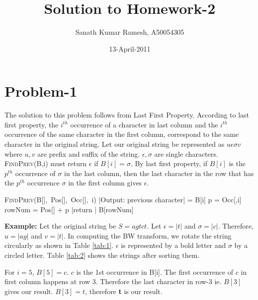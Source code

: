 \documentclass{article}
\begin{document}
\title{Solution to Homework-2}
\author{Sanath Kumar Ramesh, A50054305}
\date{13-April-2011}
\maketitle

\section{Problem-1}
The solution to this problem follows from Last First Property. According to last first property, the $i^{th}$ occurrence of a character in last column and the $i^{th}$ occurrence of the same character in the first column, correspond to the same character in the original string. Let our original string be represented as $u \epsilon \sigma v$ where $u, v$ are prefix and suffix of the string. $\epsilon,\sigma$ are single characters. \textsc{FindPrev}(B,i) must return $\epsilon$ if $B[i]=\sigma$. By last first property, if $B[i]$ is the $p^{th}$ occurrence of $\sigma$ in the last column, then the last character in the row that has the $p^{th}$ occurrence $\sigma$ in the first column gives $\epsilon$.

\begin{program}
\mbox{\textsc{FindPrev}(B[], Pos[], Occ[], i)}
|Output: previous character|
\BEGIN
	\sigma = B[i]
	p = Occ[\sigma,i]
	rowNum = Pos[\sigma] + p
	|return | B[rowNum]
\END
\end{program}


\noindent \textbf{Example:}
Let the original string be $S = agtct$. Let $\epsilon=|t|$ and $\sigma=|c|$. Therefore, $u=|ag|$ and $v=|t|$. In computing the BW transform, we rotate the string circularly as shown in Table \ref{tab:1}. $\epsilon$ is represented by a bold letter and $\sigma$ by a circled letter. Table \ref{tab:2} shows the strings after sorting them. 

	For $i=5$, $B[5]=c$. $c$ is the 1st occurrence in B[i]. The first occurrence of $c$ in first column happens at row 3. Therefore the last character in row-3 ie. $B[3]$ gives our result. $B[3]=t$, therefore \textbf{t} is our result.
\end{document}
